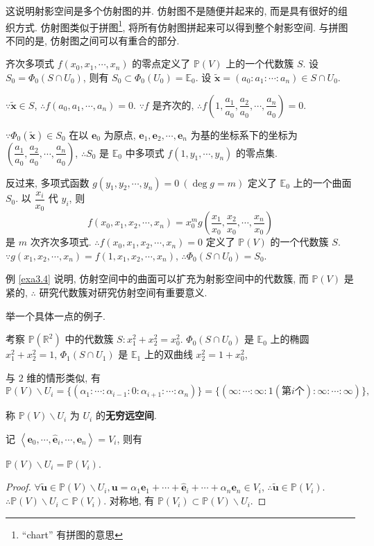 \documentclass{ctexart}
\begin{document}
这说明射影空间是多个仿射图的并. 仿射图不是随便并起来的, 而是具有很好的组织方式. 仿射图类似于拼图\footnote{``chart'' 有拼图的意思}, 将所有仿射图拼起来可以得到整个射影空间. 与拼图不同的是, 仿射图之间可以有重合的部分.
\begin{example}\label{exa3.4}
    齐次多项式 $f(x_0,x_1,\cdots,x_n)$ 的零点定义了 $\mathbb{P}(V)$ 上的一个代数簇 $S$. 设 $S_0=\Phi_0(S\cap U_0)$, 则有 $S_0\subset\Phi_0(U_0)=\mathbb{E}_0$. 设 $\tilde{\boldsymbol{x}}=(a_0:a_1:\cdots:a_n)\in S\cap U_0$.
    
    $\because\tilde{\boldsymbol{x}}\in S$, $\therefore f(a_0,a_1,\cdots,a_n)=0$. $\because f$ 是齐次的, $\therefore f\left(1,\dfrac{a_1}{a_0},\dfrac{a_2}{a_0},\cdots,\dfrac{a_n}{a_0}\right)=0$.
    
    $\because\Phi_0(\tilde{\boldsymbol{x}})\in S_0$ 在以 $\boldsymbol{e}_0$ 为原点, $\boldsymbol{e}_1,\boldsymbol{e}_2,\cdots,\boldsymbol{e}_n$ 为基的坐标系下的坐标为 $\left(\dfrac{a_1}{a_0},\dfrac{a_2}{a_0},\cdots,\dfrac{a_n}{a_0}\right)$, $\therefore S_0$ 是 $\mathbb{E}_0$ 中多项式 $f(1,y_1,\cdots,y_n)$ 的零点集.

    反过来, 多项式函数 $g(y_1,y_2,\cdots,y_n)=0\ (\deg g=m)$ 定义了 $\mathbb{E}_0$ 上的一个曲面 $S_0$. 以 $\dfrac{x_i}{x_0}$ 代 $y_i$, 则
    \[f(x_0,x_1,x_2,\cdots,x_n)=x_0^mg\left(\dfrac{x_1}{x_0},\dfrac{x_2}{x_0},\cdots,\dfrac{x_n}{x_0}\right)\]
    是 $m$ 次齐次多项式. $\therefore f(x_0,x_1,x_2,\cdots,x_n)=0$ 定义了 $\mathbb{P}(V)$ 的一个代数簇 $S$. $\because g(x_1,x_2,\cdots,x_n)=f(1,x_1,x_2,\cdots,x_n)$, $\therefore\Phi_0(S\cap U_0)=S_0$.
\end{example}
例 \ref{exa3.4} 说明, 仿射空间中的曲面可以扩充为射影空间中的代数簇, 而 $\mathbb{P}(V)$ 是紧的, $\therefore$ 研究代数簇对研究仿射空间有重要意义.

举一个具体一点的例子.
\begin{example}
    考察 $\mathbb{P}(\mathbb{R}^2)$ 中的代数簇 $S:x_1^2+x_2^2=x_0^2$. $\Phi_0(S\cap U_0)$ 是 $\mathbb{E}_0$ 上的椭圆 $x_1^2+x_2^2=1$, $\Phi_1(S\cap U_1)$ 是 $\mathbb{E}_1$ 上的双曲线 $x_2^2=1+x_0^2$,
\end{example}

与 $2$ 维的情形类似, 有
\[\mathbb{P}(V)\backslash U_i=\{(\alpha_1:\cdots:\alpha_{i-1}:0:\alpha_{i+1}:\cdots:\alpha_n)\}=\{(\infty:\cdots:\infty:1(\text{第}i\text{个}):\infty:\cdots:\infty)\},\]

称 $\mathbb{P}(V)\backslash U_i$ 为 $U_i$ 的\textbf{无穷远空间}.

记 $\left<\boldsymbol{e}_0,\cdots,\widehat{\boldsymbol{e}}_i,\cdots,\boldsymbol{e}_n\right>=V_i$, 则有
\begin{theorem}
    $\mathbb{P}(V)\backslash U_i=\mathbb{P}(V_i)$.
\end{theorem}
\begin{proof}
    $\forall\tilde{\boldsymbol{u}}\in\mathbb{P}(V)\backslash U_i,\boldsymbol{u}=\alpha_1\boldsymbol{e}_1+\cdots+\hat{\boldsymbol{e}}_i+\cdots+\alpha_n\boldsymbol{e}_n\in V_i$, $\therefore\tilde{\boldsymbol{u}}\in\mathbb{P}(V_i)$. $\therefore\mathbb{P}(V)\backslash U_i\subset\mathbb{P}(V_i)$. 对称地, 有 $\mathbb{P}(V_i)\subset\mathbb{P}(V)\backslash U_i$.
\end{proof}
\end{document}
